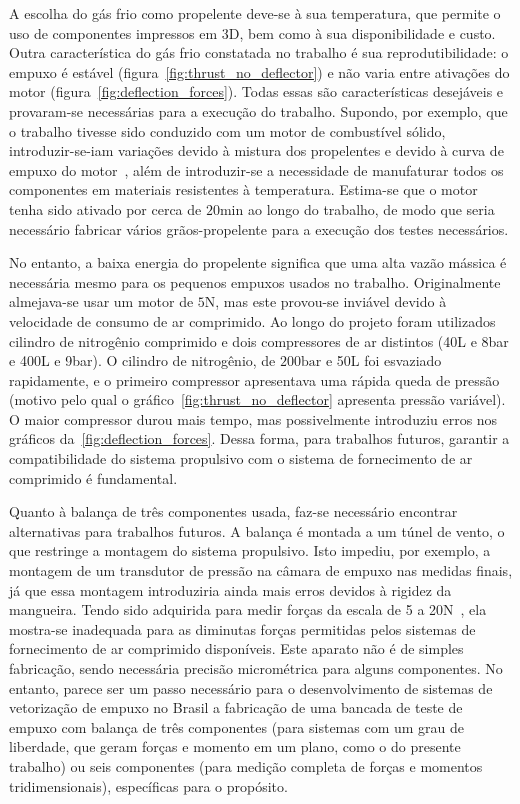 A escolha do gás frio como propelente deve-se à sua temperatura, que permite o uso de componentes impressos em 3D, bem como à sua disponibilidade e custo. Outra característica do gás frio constatada no trabalho é sua reprodutibilidade: o empuxo é estável (figura~\ref{fig:thrust_no_deflector}) e não varia entre ativações do motor (figura~\ref{fig:deflection_forces}). Todas essas são características desejáveis e provaram-se necessárias para a execução do trabalho. Supondo, por exemplo, que o trabalho tivesse sido conduzido com um motor de combustível sólido, introduzir-se-iam variações devido à mistura dos propelentes e devido à curva de empuxo do motor~\cite{Sutton}, além de introduzir-se a necessidade de manufaturar todos os componentes em materiais resistentes à temperatura. Estima-se que o motor tenha sido ativado por cerca de \(20\mathrm{min}\) ao longo do trabalho, de modo que seria necessário fabricar vários grãos-propelente para a execução dos testes necessários.

No entanto, a baixa energia do propelente significa que uma alta vazão mássica é necessária mesmo para os pequenos empuxos usados no trabalho. Originalmente almejava-se usar um motor de \(5\mathrm{N}\), mas este provou-se inviável devido à velocidade de consumo de ar comprimido. Ao longo do projeto foram utilizados cilindro de nitrogênio comprimido e dois compressores de ar distintos (40L e 8bar e 400L e 9bar). O cilindro de nitrogênio, de \(200\mathrm{bar}\) e 50L foi esvaziado rapidamente, e o primeiro compressor apresentava uma rápida queda de pressão (motivo pelo qual o gráfico~\ref{fig:thrust_no_deflector} apresenta pressão variável). O maior compressor durou mais tempo, mas possivelmente introduziu erros nos gráficos da~\ref{fig:deflection_forces}. Dessa forma, para trabalhos futuros, garantir a compatibilidade do sistema propulsivo com o sistema de fornecimento de ar comprimido é fundamental.\ 

Quanto à balança de três componentes usada, faz-se necessário encontrar alternativas para trabalhos futuros. A balança é montada a um túnel de vento, o que restringe a montagem do sistema propulsivo. Isto impediu, por exemplo, a montagem de um transdutor de pressão na câmara de empuxo nas medidas finais, já que essa montagem introduziria ainda mais erros devidos à rigidez da mangueira. Tendo sido adquirida para medir forças da escala de 5 a 20N~\cite{lab}, ela mostra-se inadequada para as diminutas forças permitidas pelos sistemas de fornecimento de ar comprimido disponíveis. Este aparato não é de simples fabricação, sendo necessária precisão micrométrica para alguns componentes. No entanto, parece ser um passo necessário para o desenvolvimento de sistemas de vetorização de empuxo no Brasil a fabricação de uma bancada de teste de empuxo com balança de três componentes (para sistemas com um grau de liberdade, que geram forças e momento em um plano, como o do presente trabalho) ou seis componentes (para medição completa de forças e momentos tridimensionais), específicas para o propósito.

